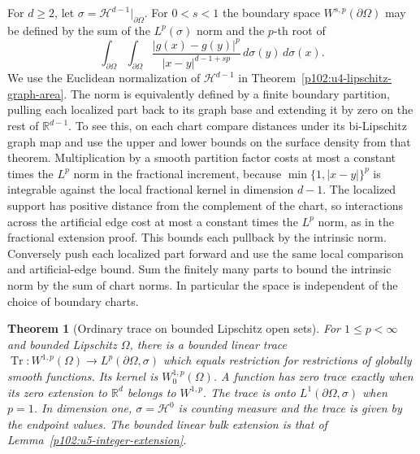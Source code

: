 \documentclass[11pt,oneside,openany]{book}
\newtheorem{theorem}{Theorem}[chapter]
\theoremstyle{definition}
\theoremstyle{remark}
\begin{document}
For \(d\ge2\), let \(\sigma=\mathcal H^{d-1}|_{\partial\Omega}\).
For \(0<s<1\) the boundary space \(W^{s,p}(\partial\Omega)\)
may be defined by the sum of the \(L^p(\sigma)\) norm and the
\(p\)-th root of
\[
 \int_{\partial\Omega}\int_{\partial\Omega}
 \frac{|g(x)-g(y)|^p}{|x-y|^{d-1+sp}}\,d\sigma(y)\,d\sigma(x).
\]
We use the Euclidean normalization of \(\mathcal H^{d-1}\) in
Theorem~\ref{p102:u4-lipschitz-graph-area}. The norm is equivalently
defined by a finite boundary partition, pulling
each localized part back to its graph base and extending it by zero
on the rest of \(\mathbb R^{d-1}\). To see this, on each chart
compare distances under its bi-Lipschitz graph map and use the
upper and lower bounds on the surface density from that theorem.
Multiplication by a smooth partition factor costs at
most a constant times the \(L^p\) norm in the fractional increment,
because \(\min\{1,|x-y|\}^p\) is integrable against the local
fractional kernel in dimension \(d-1\). The localized support
has positive distance from the complement of the chart, so
interactions across the artificial edge cost at most a constant
times the \(L^p\) norm, as in the fractional extension proof.
This bounds each pullback by the intrinsic norm. Conversely
push each localized part forward and use the same local comparison
and artificial-edge bound. Sum the finitely many parts to bound
the intrinsic norm by the sum of chart norms. In particular the
space is independent of the choice of boundary charts.

\begin{theorem}[Ordinary trace on bounded Lipschitz open sets]
\label{p102:AN-11-C05-R01}
For \(1\le p<\infty\) and bounded Lipschitz \(\Omega\),
there is a bounded linear trace
\(\operatorname{Tr}:W^{1,p}(\Omega)\to L^p(\partial\Omega,\sigma)\)
which equals restriction for restrictions of globally smooth
functions. Its kernel is \(W_0^{1,p}(\Omega)\). A function has zero
trace exactly when its zero extension to \(\mathbb R^d\)
belongs to \(W^{1,p}\). The trace is onto \(L^1(\partial\Omega,\sigma)\)
when \(p=1\). In dimension one, \(\sigma=\mathcal H^0\) is counting
measure and the trace is given by the endpoint values.
The bounded linear bulk extension is that of
Lemma~\ref{p102:u5-integer-extension}.
\end{theorem}
\end{document}
